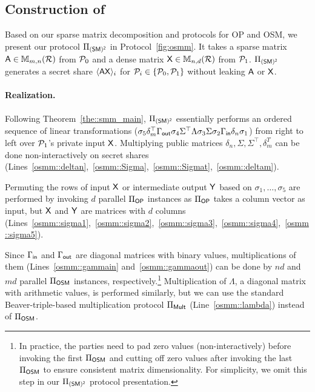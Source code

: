\subsection{Construction of \texorpdfstring{\osmm}{OSMM}}
\label{subsec:prosmm}
Based on our sparse matrix decomposition and protocols for OP and OSM, we present our \osmm protocol $\Pi_{\mathsf{(SM)^2}}$ in Protocol~\ref{fig:osmm}.
It takes a sparse matrix $\mathsf{A} \in \mathbb{M}_{m,n}(\mathcal{R})$ from $\mathcal{P}_0$ and a dense matrix $\mathsf{X} \in \mathbb{M}_{n,d}(\mathcal{R})$ from $\mathcal{P}_1$.
$\Pi_{\mathsf{(SM)^2}}$ generates a secret share $\langle \mathsf{A} \mathsf{X} \rangle_i$ for $\mathcal{P}_i \in \{\mathcal{P}_0, \mathcal{P}_1\}$ without leaking $\mathsf{A}$ or $\mathsf{X}$.

\paragraph{\osmm Realization.}
Following Theorem~\ref{the::smm_main}, $\Pi_{\mathsf{(SM)^2}}$ essentially performs an ordered sequence of linear transformations ($\sigma_5 \delta_m ^{\top} \Gamma_{\mathsf{out}} \sigma_4 \Sigma ^{\top} \allowbreak\Lambda \sigma_3 \Sigma \sigma_2 \Gamma_{\mathsf{in}} \delta_n \sigma_1$) from right to left over $\mathcal{P}_1$'s private input $\mathsf{X}$.
Multiplying public matrices $\delta_n, \Sigma, \Sigma^{\top}, \delta_m^T$ can be done non-interactively on secret shares %
(Lines~\ref{osmm::deltan},~\ref{osmm::Sigma},~\ref{osmm::Sigmat},~\ref{osmm::deltam}).

Permuting the rows of input $\mathsf{X}$ or intermediate output $\mathsf{Y}$ based on $\sigma_1, \ldots, \sigma_5$ are performed by invoking $d$ parallel ${\Pi}_{\mathsf{OP}}$ instances as ${\Pi}_{\mathsf{OP}}$ takes a column vector as input, 
but $\mathsf{X}$ and $\mathsf{Y}$ are matrices with $d$ columns (Lines~\ref{osmm::sigma1},~\ref{osmm::sigma2},~\ref{osmm::sigma3},~\ref{osmm::sigma4},~\ref{osmm::sigma5}).

Since $\Gamma_{\mathsf{in}}$ and $\Gamma_{\mathsf{out}}$ are diagonal matrices with binary values, multiplications of them (Lines~\ref{osmm::gammain} and~\ref{osmm::gammaout}) can be done by $nd$ and $md$ parallel $\Pi_{\mathsf{OSM}}$ instances, respectively.\footnote{
In practice, the parties need to pad zero values (non-interactively) before invoking the first $\Pi_{\mathsf{OSM}}$ and cutting off zero values after invoking the last $\Pi_{\mathsf{OSM}}$ to ensure consistent matrix dimensionality.
For simplicity, we omit this step in our $\Pi_{\mathsf{(SM)^2}}$ protocol presentation.
}
Multiplication of $\Lambda$, a diagonal matrix with arithmetic values, is performed similarly,
but we can use the standard Beaver-triple-based multiplication protocol $\Pi_{\mathsf{Mult}}$ (Line~\ref{osmm::lambda}) instead of $\Pi_{\mathsf{OSM}}$.

